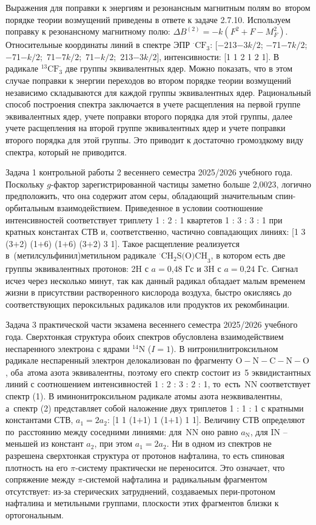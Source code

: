 Выражения для поправки к энергиям и резонансным магнитным полям во~втором порядке теории возмущений приведены в ответе к задаче 2.7.10. Используем поправку к резонансному магнитному полю: $\Delta B^{(2)} = -k\left( F^2 + F - M_F^2 \right)$. Относительные координаты линий в спектре ЭПР $^{\boldsymbol{\cdot}}\text{CF}_3$: [$-$213$-3k/2$; $-$71$-7k/2$; $-$71$-k/2$; $\,$71$-7k/2$; $\,$71$-k/2$; $\,$213$-3k/2$], интенсивности: [1 1 2 1 2 1]. В радикале $^{13}\text{CF}_3^{\boldsymbol{\cdot}}$ две группы эквивалентных ядер. Можно показать, что в этом случае поправки к энергии переходов во втором порядке теории возмущений независимо складываются для каждой группы эквивалентных ядер. Рациональный способ построения спектра заключается в учете расщепления на первой группе эквивалентных ядер, учете поправки второго порядка для этой группы, далее учете расщепления на второй группе эквивалентных ядер и учете поправки второго порядка для этой группы. Это приводит к достаточно громоздкому виду спектра, который не приводится.\par
{} Задача 1 контрольной работы 2 весеннего семестра 2025/2026 учебного года. Поскольку $g$-фактор зарегистрированной частицы заметно больше 2,0023, логично предположить, что она содержит атом серы, обладающий значительным спин-орбитальным взаимодействием. Приведенное в условии соотношение интенсивностей соответствует триплету 1 : 2 : 1 квартетов 1 : 3 : 3 : 1 при кратных константах СТВ и, соответственно, частично совпадающих линиях: [1 3 (3$+$2) (1$+$6) (1$+$6) (3$+$2) 3 1]. Такое расщепление реализуется в~(метилсульфинил)метильном радикале $^{\boldsymbol{\cdot}}\text{CH}_2\text{S(O)CH}_3$, в котором есть две группы эквивалентных протонов: 2H с $a = \text{0,48}$ Гс и 3H с $a = \text{0,24}$ Гс. Сигнал исчез через несколько минут, так как данный радикал обладает малым временем жизни в присутствии растворенного кислорода воздуха, быстро окисляясь до соответствующих пероксильных радикалов или продуктов их рекомбинации.\par
{} Задача 3 практической части экзамена весеннего семестра 2025/2026 учебного года. Сверхтонкая структура обоих спектров обусловлена взаимодействием неспаренного электрона с ядрами $^{14}\text{N}$ ($I=1$). В нитронилнитроксильном радикале неспаренный электрон делокализован по фрагменту $\text{O}-\text{N}-\text{C}-\text{N}-\text{O}$, оба~атома азота эквивалентны, поэтому его спектр состоит из~5 эквидистантных линий с соотношением интенсивностей 1 : 2 : 3 : 2 : 1, то~есть~NN соответствует спектр (1). В иминонитроксильном радикале атомы азота неэквивалентны, а~спектр (2) представляет собой наложение двух триплетов 1 : 1 : 1 с кратными константами СТВ, $a_1 = 2a_2$: [1 1 (1$+$1) 1 (1$+$1) 1 1]. Величину СТВ определяют по~расстоянию между соседними линиями: для~NN оно равно $a_{\text{N}}$, для IN – меньшей из констант $a_2$, при этом $a_1=2a_2$. Ни в одном из спектров не разрешена сверхтонкая структура от протонов нафталина, то есть спиновая плотность на его $\pi$-систему практически не переносится. Это означает, что сопряжение между $\pi$-системой нафталина и~радикальным фрагментом отсутствует: из-за стерических затруднений, создаваемых пери-протоном нафталина и метильными группами, плоскости этих фрагментов близки к ортогональным.\par
